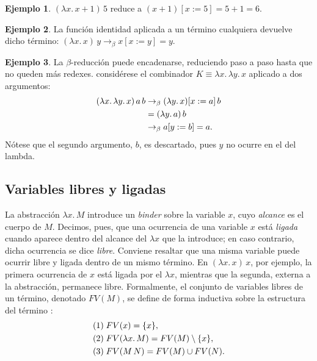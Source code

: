 \documentclass[a4paper,12pt]{report}
\theoremstyle{definition}
\newtheorem{example}{Ejemplo}[chapter]
\theoremstyle{plain}
\theoremstyle{remark}
\begin{document}
\begin{example}
  $(\lambda x.\, x + 1)\, 5$ reduce a $(x + 1)[x := 5] = 5 + 1 = 6$.
\end{example}

\begin{example}
  La función identidad aplicada a un término cualquiera devuelve dicho término:
  $(\lambda x.\, x)\, y \to_\beta x[x := y] = y$.
\end{example}

\begin{example}
  La $\beta$-reducción puede encadenarse, reduciendo paso a paso hasta que no queden
  más redexes. considérese el combinador $K \equiv \lambda x.\, \lambda y.\, x$ aplicado a
  dos argumentos:
  \begin{align}
    (\lambda x.\, \lambda y.\, x)\, a\, b
      & \to_\beta (\lambda y.\, x)[x := a]\, b \notag \\
      & = (\lambda y.\, a)\, b \notag \\
      & \to_\beta a[y := b] = a. \notag
  \end{align}
  N\'otese que el segundo argumento, $b$, es descartado, pues $y$ no ocurre en el  del lambda.
\end{example}

\subsection{Variables libres y ligadas}
La abstracci\'on $\lambda x.\, M$ introduce un \textit{binder} sobre la variable
$x$, cuyo \textit{alcance} es el cuerpo de $M$. Decimos, pues, que una ocurrencia de
una variable $x$ est\'a \textit{ligada} cuando aparece dentro del alcance del $\lambda x$
que la introduce; en caso contrario, dicha ocurrencia se dice \textit{libre}.
\newline
\newline
Conviene resaltar que una misma variable puede ocurrir libre y ligada dentro de un mismo
t\'ermino. En $(\lambda x.\, x)\, x$, por ejemplo, la primera ocurrencia de $x$ est\'a
ligada por el $\lambda x$, mientras que la segunda, externa a la abstracci\'on, permanece
libre. Formalmente, el conjunto de variables libres de un t\'ermino, denotado $FV(M)$, se define
de forma inductiva sobre la estructura del t\'ermino \citep{pierce2002}:
\begin{align}
& (1) \; FV(x) = \{x\}, \notag \\
& (2) \; FV(\lambda x.\, M) = FV(M) \setminus \{x\}, \notag \\
& (3) \; FV(M\,N) = FV(M) \cup FV(N). \notag
\end{align}
\end{document}
